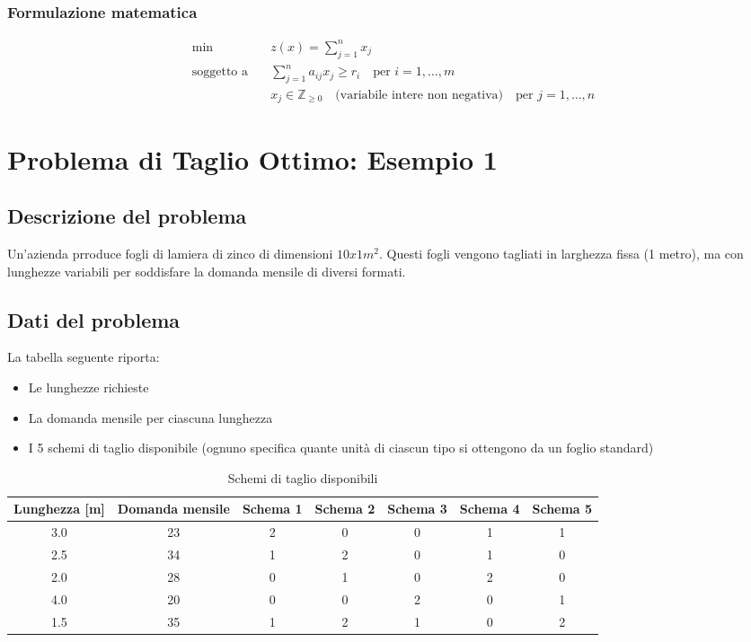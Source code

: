 \subsubsection{Formulazione matematica}
\[
\begin{aligned}
\min \quad & z(x) = \sum_{j=1}^{n} x_j \\
\text{soggetto a} \quad & \sum_{j=1}^{n} a_{ij} x_j \geq r_i \quad \text{per } i = 1, \dots, m \\
& x_j \in \mathbb{Z}_{\geq 0} \quad \text{(variabile intere non negativa)} \quad \text{per } j = 1, \dots, n
\end{aligned}
\]

\section{Problema di Taglio Ottimo: Esempio 1}
\subsection{Descrizione del problema}

Un'azienda prroduce fogli di lamiera di zinco di dimensioni 
$10 x 1 m^2$. Questi fogli vengono tagliati in larghezza fissa (1 metro), 
ma con lunghezze variabili per soddisfare la domanda mensile di diversi formati.

\subsection{Dati del problema}

La tabella seguente riporta:
\begin{itemize}
    \item Le lunghezze richieste
    \item La domanda mensile per ciascuna lunghezza
    \item I 5 schemi di taglio disponibile (ognuno specifica quante unità di ciascun tipo si ottengono da un foglio standard)
\end{itemize}

\begin{table}[htbp]
    \centering
    \caption{Schemi di taglio disponibili}
    \begin{tabular}{|c|c|c|c|c|c|c|}
        \hline
        \textbf{Lunghezza [m]} & \textbf{Domanda mensile} & \textbf{Schema 1} & \textbf{Schema 2} & \textbf{Schema 3} & \textbf{Schema 4} & \textbf{Schema 5} \\
        \hline
        3.0 & 23 & 2 & 0 & 0 & 1 & 1 \\
        2.5 & 34 & 1 & 2 & 0 & 1 & 0 \\
        2.0 & 28 & 0 & 1 & 0 & 2 & 0 \\
        4.0 & 20 & 0 & 0 & 2 & 0 & 1 \\
        1.5 & 35 & 1 & 2 & 1 & 0 & 2 \\
        \hline
    \end{tabular}
\end{table}

